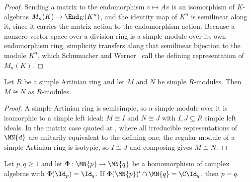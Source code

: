 \begin{proof}\leanok
    Sending a matrix to the endomorphism $v\mapsto Av$ is an isomorphism of
    $K$-algebras $M_n(K)\to\End_{K}(K^n)$, and the identity map of $K^n$ is
    semilinear along it, since it carries the matrix action to the
    endomorphism action.  Because a nonzero vector space over a division
    ring is a simple module over its own endomorphism ring, simplicity
    transfers along that semilinear bijection to the module $K^n$, which
    Schumacher and Werner~\cite[lines~2112--2114]{SchumacherWerner2004QCA}
    call the defining representation of $M_n(K)$.
\end{proof}

\begin{lemma}
    \label{lem:matalg_simple_module_unique}
    \leanok
    Let $R$ be a simple Artinian ring and let $M$ and $N$ be simple
    $R$-modules.  Then $M\cong N$ as $R$-modules.
\end{lemma}

\begin{proof}\leanok
    A simple Artinian ring is semisimple, so a simple module over it is
    isomorphic to a simple left ideal: $M\cong I$ and $N\cong J$ with
    $I,J\subseteq R$ simple left ideals.  In the matrix case quoted at
    \cite[lines~2112--2114]{SchumacherWerner2004QCA}, where all irreducible
    representations of $\MN{d}$ are unitarily equivalent to the defining
    one, the regular module of a simple Artinian ring is isotypic, so
    $I\cong J$ and composing gives $M\cong N$.
\end{proof}

\begin{lemma}
    \label{thm:matalg_size_eq}
    \leanok
    Let $p,q\geq1$ and let $\Phi:\MN{p}\to\MN{q}$ be a homomorphism of
    complex algebras with $\Phi(\Id_p)=\Id_q$.  If
    $\Phi(\MN{p})^{\prime}\cap\MN{q}=\C\Id_q$, then $p=q$.
\end{lemma}

